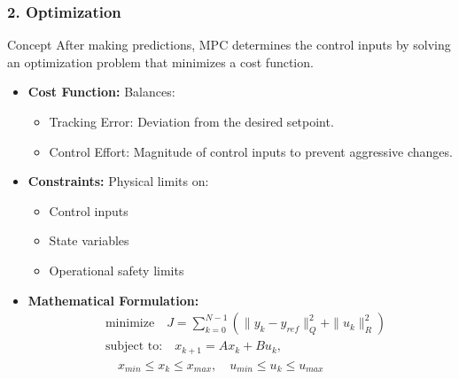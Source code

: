 \documentclass[aspectratio=169]{beamer}
\begin{document}
\begin{frame}[fragile]
    \frametitle{2. Optimization}
    \begin{block}{Concept}
        After making predictions, MPC determines the control inputs by solving an optimization problem that minimizes a cost function.
    \end{block}
    \begin{itemize}
        \item \textbf{Cost Function:} Balances:
            \begin{itemize}
                \item Tracking Error: Deviation from the desired setpoint.
                \item Control Effort: Magnitude of control inputs to prevent aggressive changes.
            \end{itemize}
        \item \textbf{Constraints:} Physical limits on:
            \begin{itemize}
                \item Control inputs
                \item State variables
                \item Operational safety limits 
            \end{itemize}
        \item \textbf{Mathematical Formulation:}
            \begin{equation}
            \begin{aligned}
            & \text{minimize} \quad J = \sum_{k=0}^{N-1} \left( \|y_k - y_{ref}\|^2_Q + \|u_k\|^2_R \right) \\
            & \text{subject to:} \quad x_{k+1} = Ax_k + Bu_k, \\
            & \quad x_{min} \leq x_k \leq x_{max}, \quad u_{min} \leq u_k \leq u_{max}
            \end{aligned}
            \end{equation}
        \end{itemize}
\end{frame}
\end{document}
